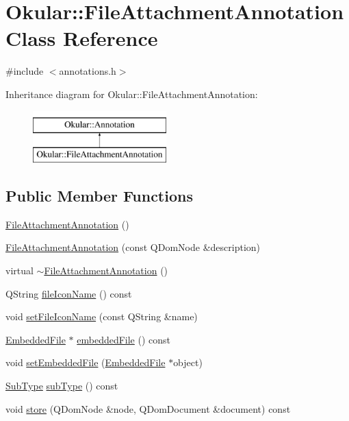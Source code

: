\hypertarget{classOkular_1_1FileAttachmentAnnotation}{\section{Okular\+:\+:File\+Attachment\+Annotation Class Reference}
\label{classOkular_1_1FileAttachmentAnnotation}
}


{\ttfamily \#include $<$annotations.\+h$>$}

Inheritance diagram for Okular\+:\+:File\+Attachment\+Annotation\+:\begin{figure}[H]
\begin{center}
\leavevmode
\includegraphics[height=2.000000cm]{classOkular_1_1FileAttachmentAnnotation}
\end{center}
\end{figure}
\subsection*{Public Member Functions}
\begin{DoxyCompactItemize}
\item 
\hyperlink{classOkular_1_1FileAttachmentAnnotation_aa5a7ce5fc6e974f767f0e2fc284b6964}{File\+Attachment\+Annotation} ()
\item 
\hyperlink{classOkular_1_1FileAttachmentAnnotation_a66e10f75b439ddd5a55b5b9d5d8d6f8d}{File\+Attachment\+Annotation} (const Q\+Dom\+Node \&description)
\item 
virtual \hyperlink{classOkular_1_1FileAttachmentAnnotation_a5d33d79abd5287364896cc6738319183}{$\sim$\+File\+Attachment\+Annotation} ()
\item 
Q\+String \hyperlink{classOkular_1_1FileAttachmentAnnotation_a8167c8dbf60abfe03b7413bf65b35957}{file\+Icon\+Name} () const 
\item 
void \hyperlink{classOkular_1_1FileAttachmentAnnotation_a2238e204c2b8472aeba4f4797c347287}{set\+File\+Icon\+Name} (const Q\+String \&name)
\item 
\hyperlink{classOkular_1_1EmbeddedFile}{Embedded\+File} $\ast$ \hyperlink{classOkular_1_1FileAttachmentAnnotation_a22ff85c689647a6daa6bac053fe60cbb}{embedded\+File} () const 
\item 
void \hyperlink{classOkular_1_1FileAttachmentAnnotation_abf9515f11176c72ed9ac37c496ecfc0b}{set\+Embedded\+File} (\hyperlink{classOkular_1_1EmbeddedFile}{Embedded\+File} $\ast$object)
\item 
\hyperlink{classOkular_1_1Annotation_af71b46e37d5f850b97d5c4de3be9aac0}{Sub\+Type} \hyperlink{classOkular_1_1FileAttachmentAnnotation_a2b823f6978905f825398aaab5a0621ef}{sub\+Type} () const 
\item 
void \hyperlink{classOkular_1_1FileAttachmentAnnotation_a3029aa2aaff2324b99b8d8fc0e23d9c1}{store} (Q\+Dom\+Node \&node, Q\+Dom\+Document \&document) const 
\end{DoxyCompactItemize}
